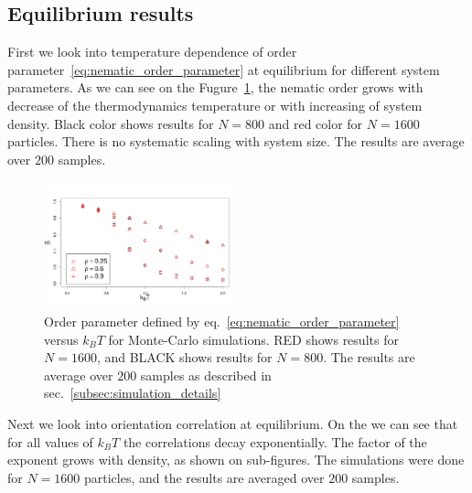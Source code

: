 \subsection{Equilibrium results}
\label{subsec:monte_carlo_results}
First we look into temperature dependence of order parameter~\eqref{eq:nematic_order_parameter} at equilibrium for different system parameters. As we can see on the Fugure~\ref{fig:op_kbt}, the nematic order grows with decrease of the thermodynamics temperature or with increasing of system density. Black color shows results for $N = 800$ and red color for $N = 1600$ particles. There is no systematic scaling with system size. The results are average over $200$ samples.

\begin{figure}[h]
	\centering
	\includegraphics[width=0.5\textwidth]{Images/op_vs_kbt_MC}
	\captionsetup{justification=centering, width=0.9\columnwidth}
	\caption{Order parameter defined by eq.~\eqref{eq:nematic_order_parameter} versus $k_BT$ for Monte-Carlo simulations. RED shows results for $N = 1600$, and BLACK shows results for $N = 800$. The results are average over $200$ samples as described in sec.~\ref{subsec:simulation_details}}
	\label{fig:op_kbt}
\end{figure}

Next we look into orientation correlation at equilibrium. On the  we can see that for all values of $k_BT$ the correlations decay exponentially. The factor of the exponent grows with density, as shown on sub-figures. The simulations were done for $N = 1600$ particles, and the results are averaged over $200$ samples.

